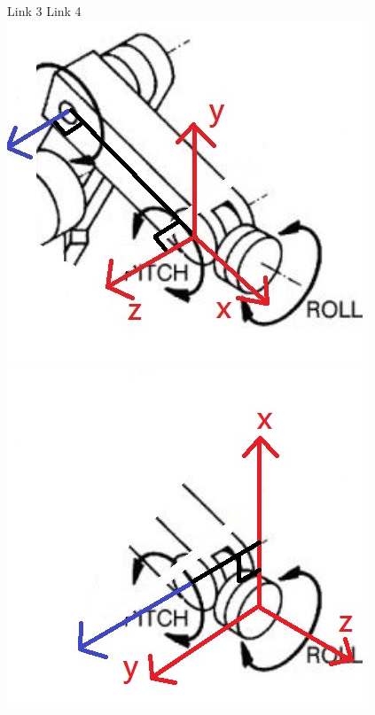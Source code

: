 \documentclass[12pt, a4paper]{article}
\begin{document}
\begin{enumerate}[(1)]
\newline
Link 3 \hspace{6cm} Link 4 \\
\includegraphics[scale = 0.5]{link3.JPG}
\hspace{1cm}
\includegraphics[scale = 0.5]{link4.JPG} \\


\end{enumerate}
\end{document}
